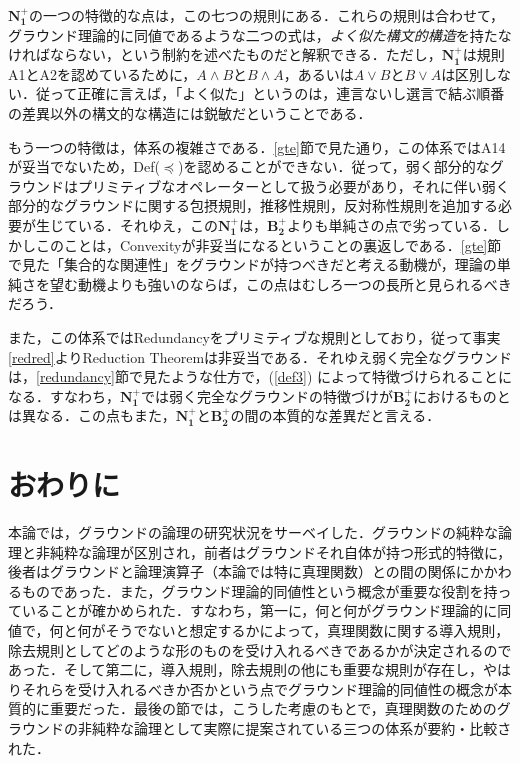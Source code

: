 \documentclass[twoside,14Q,uplatex,dvipdfmx]{jsarticle}
\theoremstyle{definition}
\begin{document}
$\mathbf{N_{1}^{+}}$の一つの特徴的な点は，この七つの規則にある．これらの規則は合わせて，グラウンド理論的に同値であるような二つの式は，\emph{よく似た構文的構造}を持たなければならない，という制約を述べたものだと解釈できる．ただし，$\mathbf{N_{1}^{+}}$は規則A1とA2を認めているために，$A\land B$と$B\land A$，あるいは$A\lor B$と$B\lor A$は区別しない．従って正確に言えば，「よく似た」というのは，連言ないし選言で結ぶ順番の差異以外の構文的な構造には鋭敏だということである．

もう一つの特徴は，体系の複雑さである．\ref{gte}節で見た通り，この体系ではA14が妥当でないため，Def($\preceq$)を認めることができない．従って，弱く部分的なグラウンドはプリミティブなオペレーターとして扱う必要があり，それに伴い弱く部分的なグラウンドに関する包摂規則，推移性規則，反対称性規則を追加する必要が生じている．それゆえ，この$\mathbf{N_{1}^{+}}$は，$\mathbf{B_{2}^{+}}$よりも単純さの点で劣っている．しかしこのことは，Convexityが非妥当になるということの裏返しである．\ref{gte}節で見た「集合的な関連性」をグラウンドが持つべきだと考える動機が，理論の単純さを望む動機よりも強いのならば，この点はむしろ一つの長所と見られるべきだろう．

また，この体系ではRedundancyをプリミティブな規則としており，従って事実\ref{redred}よりReduction Theoremは非妥当である．それゆえ弱く完全なグラウンドは，\ref{redundancy}節で見たような仕方で，(\ref{def3}) によって特徴づけられることになる．すなわち，$\mathbf{N_{1}^{+}}$では弱く完全なグラウンドの特徴づけが$\mathbf{B_{2}^{+}}$におけるものとは異なる．この点もまた，$\mathbf{N_{1}^{+}}$と$\mathbf{B_{2}^{+}}$の間の本質的な差異だと言える．
%
%
%
\section{おわりに}
本論では，グラウンドの論理の研究状況をサーベイした．グラウンドの純粋な論理と非純粋な論理が区別され，前者はグラウンドそれ自体が持つ形式的特徴に，後者はグラウンドと論理演算子（本論では特に真理関数）との間の関係にかかわるものであった．また，グラウンド理論的同値性という概念が重要な役割を持っていることが確かめられた．すなわち，第一に，何と何がグラウンド理論的に同値で，何と何がそうでないと想定するかによって，真理関数に関する導入規則，除去規則としてどのような形のものを受け入れるべきであるかが決定されるのであった．そして第二に，導入規則，除去規則の他にも重要な規則が存在し，やはりそれらを受け入れるべきか否かという点でグラウンド理論的同値性の概念が本質的に重要だった．最後の節では，こうした考慮のもとで，真理関数のためのグラウンドの非純粋な論理として実際に提案されている三つの体系が要約・比較された．
\end{document}

